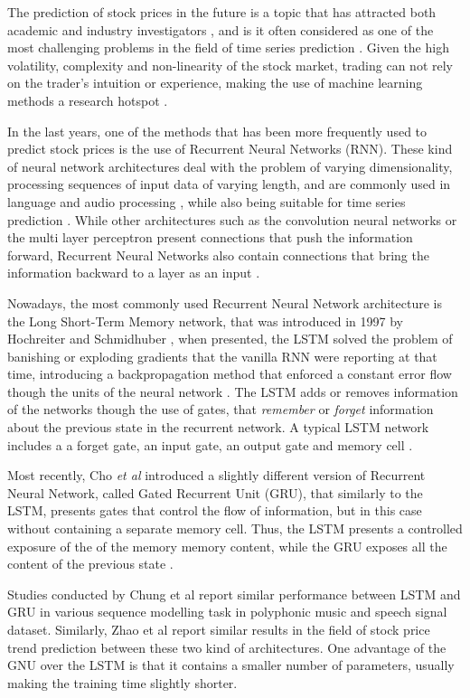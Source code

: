 \documentclass[10pt,twocolumn,letterpaper]{article}
\begin{document}
The prediction of stock prices in the future is a topic that has attracted both academic and industry investigators \cite{Zhao2020}, and is it often considered as one of the most challenging problems in the field of time series prediction \cite{Kara2011}. Given the high volatility, complexity and non-linearity of the stock market, trading can not rely on the trader's intuition or experience, making the use of machine learning methods a research hotspot \cite{Qiu2020}.

In the last years, one of the methods that has been more frequently used to predict stock prices is the use of Recurrent Neural Networks (RNN). These kind of neural network architectures deal with the problem of varying dimensionality, processing sequences of input data of varying length, and are commonly used in language and audio processing \cite{Skansi2018}, while also being suitable for time series prediction \cite{Zhao2020}. While other architectures such as the convolution neural networks or the multi layer perceptron present connections that push the information forward, Recurrent Neural Networks also contain connections that bring the information backward to a layer as an input \cite{Skansi2018}.

Nowadays, the most commonly used Recurrent Neural Network architecture is the Long Short-Term Memory network, that was introduced in 1997 by Hochreiter and Schmidhuber \cite{Hochreiter1997}, when presented, the LSTM solved the problem of banishing or exploding gradients that the vanilla RNN were reporting at that time, introducing a backpropagation method that enforced a constant error flow though the units of the neural network \cite{Hochreiter1997}. The LSTM adds or removes information of the networks though the use of gates, that \textit{remember} or \textit{forget} information about the previous state in the recurrent network. A typical LSTM network includes a  a forget gate, an input gate, an output gate and memory cell \cite{Chung2014}. 

Most recently, Cho \textit{et al} \cite{Cho2014} introduced a slightly different version of Recurrent Neural Network, called Gated Recurrent Unit (GRU), that similarly to the LSTM, presents gates that control the flow of information, but in this case without containing a separate memory cell. Thus, the LSTM presents a controlled exposure of the of the memory memory content, while the GRU exposes all the content of the previous state \cite{Chung2014}.

Studies conducted by Chung et al \cite{Chung2014} report similar performance between LSTM and GRU in various sequence modelling task in polyphonic music and speech signal dataset. Similarly, Zhao et al \cite{Zhao2020} report similar results in the field of stock price trend prediction between these two kind of architectures. One advantage of the GNU over the LSTM is that it contains a smaller number of parameters\cite{Chung2014}, usually making the training time slightly shorter.
\end{document}

